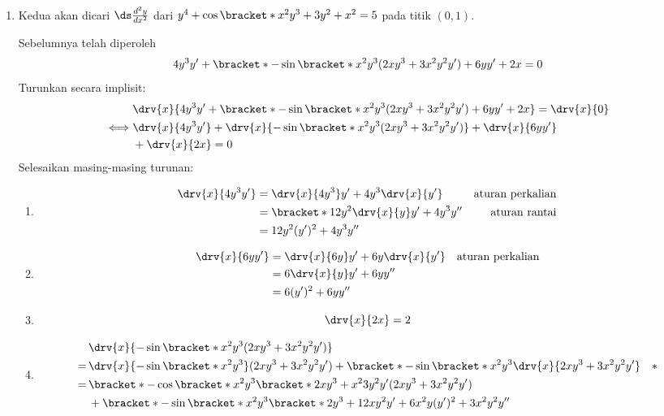 \begin{enumerate}[leftmargin=*, label={\arabic*}.]
\begin{enumerate}[label={\alph*}.]
    \item Kedua akan dicari $\ds\frac{d^{2}y}{dx^{2}}$ dari 
    $y^{4}+\cos\bracket*{x^{2}y^{3}}+3y^{2}+x^{2}=5$ pada titik $(0,1)$.

    Sebelumnya telah diperoleh
    \[
    4y^{3}y'+\bracket*{-\sin\bracket*{x^{2}y^{3}}(2xy^{3}+3x^{2}y^{2}y')}+6yy'+2x=0
    \]
    Turunkan secara implisit:
    \begin{align*}
        &\drv{x}{4y^{3}y'
        +\bracket*{-\sin\bracket*{x^{2}y^{3}}(2xy^{3}+3x^{2}y^{2}y')}+6yy'+2x}=
        \drv{x}{0}\\
        \iff &\drv{x}{4y^{3}y'}+\drv{x}{-\sin\bracket*{x^{2}y^{3}}(2xy^{3}+3x^{2}y^{2}y')}
        +\drv{x}{6yy'}\\
        &+\drv{x}{2x}=0
    \end{align*}
    Selesaikan masing-masing turunan:
    \begin{enumerate}[label={\arabic*})]
    \item \begin{align*}
        \drv{x}{4y^{3}y'} &= \drv{x}{4y^{3}}y' + 4y^{3}\drv{x}{y'}
        &\text{aturan perkalian}\\
        &=\bracket*{12y^{2}\drv{x}{y}}y'+4y^{3}y''
        &\text{aturan rantai}\\
        &=12y^{2}(y')^{2}+4y^{3}y''
    \end{align*}
    \item \begin{align*}
        \drv{x}{6yy'} &= \drv{x}{6y}y'+6y\drv{x}{y'}
        &\text{aturan perkalian}\\
        &=6\drv{x}{y}y'+6yy'' \\
        &= 6(y')^{2}+6yy''
    \end{align*}
    \item \[
    \drv{x}{2x} = 2
    \]
    \item \begin{align*}
        &\drv{x}{-\sin\bracket*{x^{2}y^{3}}(2xy^{3}+3x^{2}y^{2}y')}\\
        =\,&\drv{x}{-\sin\bracket*{x^{2}y^{3}}}(2xy^{3}+3x^{2}y^{2}y')
        +\bracket*{-\sin\bracket*{x^{2}y^{3}}}\drv{x}{2xy^{3}+3x^{2}y^{2}y'}
        \quad *\\
        =\,&\bracket*{-\cos\bracket*{x^{2}y^{3}}\bracket*{2xy^{3}+x^{2}3y^{2}y'}}
        (2xy^{3}+3x^{2}y^{2}y')\\
        &+\bracket*{-\sin\bracket*{x^{2}y^{3}}}
        \bracket*{2y^{3}+12xy^{2}y'+6x^{2}y(y')^{2}+3x^{2}y^{2}y''}\\

\end{align*}
\end{enumerate}
\end{enumerate}
\end{enumerate}

